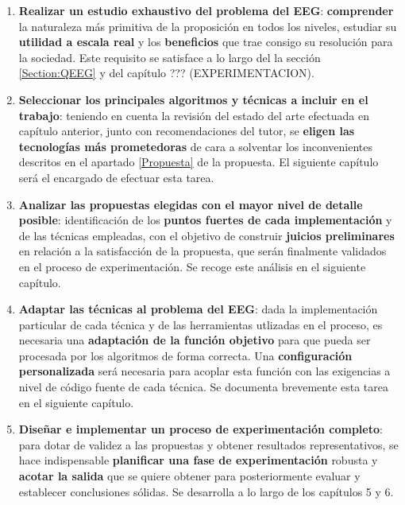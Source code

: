 \begin{enumerate}
	\item \label{tarea1} \textbf{Realizar un estudio exhaustivo del problema del EEG}: \textbf{comprender} la naturaleza más primitiva de la proposición en todos los niveles, estudiar su \textbf{utilidad a escala real} y los \textbf{beneficios} que trae consigo su resolución para la sociedad. Este requisito se satisface a lo largo del la sección \ref{Section:QEEG} y del capítulo ??? (EXPERIMENTACION).
	
	\item \label{tarea2} \textbf{Seleccionar los principales algoritmos y técnicas a incluir en el trabajo}: teniendo en cuenta la revisión del estado del arte efectuada en capítulo anterior, junto con recomendaciones del tutor, se \textbf{eligen las tecnologías más prometedoras} de cara a solventar los inconvenientes descritos en el apartado \ref{Propuesta} de la propuesta. El siguiente capítulo será el encargado de efectuar esta tarea.
	
	\item  \label{tarea3}\textbf{Analizar las propuestas elegidas con el mayor nivel de detalle posible}: identificación de los \textbf{puntos fuertes de cada implementación} y de las técnicas empleadas, con el objetivo de construir \textbf{juicios preliminares} en relación a la satisfacción de la propuesta, que serán finalmente validados en el proceso de experimentación. Se recoge este análisis en el siguiente capítulo.
	
	\item \label{tarea4} \textbf{Adaptar las técnicas al problema del EEG}: dada la implementación particular de cada técnica y de las herramientas utlizadas en el proceso, es necesaria una \textbf{adaptación de la función objetivo} para que pueda ser procesada por los algoritmos de forma correcta. Una \textbf{configuración personalizada} será necesaria para acoplar esta función con las exigencias a nivel de código fuente de cada técnica. Se documenta brevemente esta tarea en el siguiente capítulo.
	
	\item  \label{tarea5}\textbf{Diseñar e implementar un proceso de experimentación completo}: para dotar de validez a las propuestas y obtener resultados representativos, se hace indispensable \textbf{planificar una fase de experimentación} robusta y \textbf{acotar la salida} que se quiere obtener para posteriormente evaluar y establecer conclusiones sólidas. Se desarrolla a lo largo de los capítulos 5 y 6.
	

\end{enumerate}
